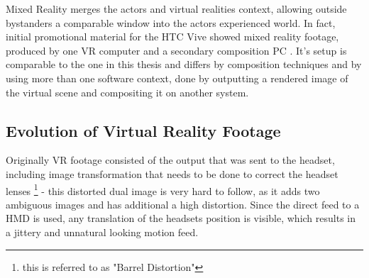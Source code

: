 Mixed Reality merges the actors and virtual realities context, allowing outside 
bystanders a comparable window into the actors experienced world. In fact, 
initial promotional material for the HTC Vive showed mixed reality footage, 
produced by one VR computer and a secondary composition PC 
\cite{valve:mr-production:2016}. It's setup is comparable to the one in this 
thesis and differs by composition techniques and by using more than one 
software context, done by outputting a rendered image of the virtual scene and 
compositing it on another system.

\subsection{Evolution of Virtual Reality Footage}

Originally VR footage consisted of the output that was sent to the headset, 
including image transformation that needs to be done to correct the headset 
lenses \footnote{this is referred to as "Barrel Distortion"} - this distorted 
dual image is very hard to follow, as it adds two ambiguous images and has 
additional a high distortion. Since the direct feed to a HMD is used, any 
translation of the headsets position is visible, which results in a jittery and 
unnatural looking motion feed.

